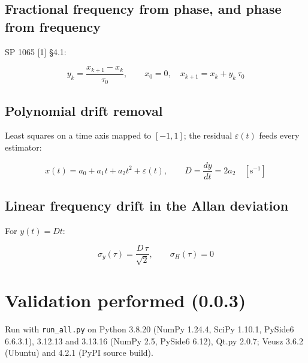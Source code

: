 \documentclass[10pt,a4paper]{article}
\begin{document}

\hypertarget{fractional-frequency-from-phase-and-phase-from-frequency}{%
\subsection{Fractional frequency from phase, and phase from frequency}\label{fractional-frequency-from-phase-and-phase-from-frequency}}

SP 1065 {[}1{]} §4.1:

\[
y_k = \frac{x_{k+1} - x_k}{\tau_0}, \qquad
x_0 = 0,\quad x_{k+1} = x_k + y_k\,\tau_0
\]


\hypertarget{polynomial-drift-removal}{%
\subsection{Polynomial drift removal}\label{polynomial-drift-removal}}

Least squares on a time axis mapped to \([-1, 1]\); the residual
\(\varepsilon(t)\) feeds every estimator:

\[
x(t) = a_0 + a_1 t + a_2 t^2 + \varepsilon(t), \qquad
D = \frac{dy}{dt} = 2 a_2 \quad [\mathrm{s^{-1}}]
\]


\hypertarget{linear-frequency-drift-in-the-allan-deviation}{%
\subsection{Linear frequency drift in the Allan deviation}\label{linear-frequency-drift-in-the-allan-deviation}}

For \(y(t) = D t\):

\[
\sigma_y(\tau) = \frac{D\,\tau}{\sqrt{2}}, \qquad
\sigma_H(\tau) = 0
\]


\hypertarget{validation-performed-003}{%
\section{Validation performed (0.0.3)}\label{validation-performed-003}}

Run with \texttt{run\_\allowbreak{}all.py} on Python 3.8.20 (NumPy 1.24.4, SciPy 1.10.1, PySide6
6.6.3.1), 3.12.13 and 3.13.16 (NumPy 2.5, PySide6 6.12), Qt.py 2.0.7; Veusz
3.6.2 (Ubuntu) and 4.2.1 (PyPI source build).
\end{document}

